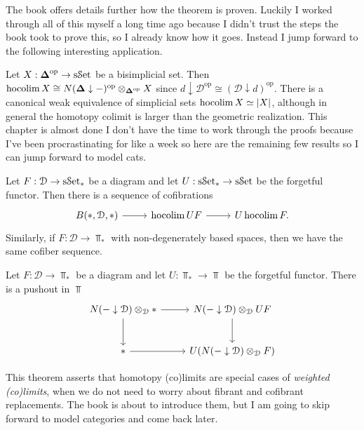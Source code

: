 The book offers details further how the theorem is proven. Luckily I worked through all of this myself a long time ago because I didn't trust the steps the book took to prove this, so I already know how it goes. Instead I jump forward to the following interesting application.

Let $X : \boldsymbol{\Delta} ^{\mathrm{op}}  \to \mathrm{s}\mathcal{S}\mathrm{et}$ be a bisimplicial set. Then $\operatorname*{hocolim} X \cong N(\boldsymbol{\Delta} \downarrow -)^{\mathrm{op}} \otimes_{\boldsymbol{\Delta} ^{\mathrm{op}} } X$ since $d\downarrow \mathcal{D} ^{\mathrm{op}} \cong (\mathcal{D} \downarrow d)^{\mathrm{op}} $. There is a canonical weak equivalence of simplicial sets $\operatorname*{hocolim} X \simeq \left| X \right| $, although in general the homotopy colimit is larger than the geometric realization. This chapter is almost done I don't have the time to work through the proofs because I've been procrastinating for like a week so here are the remaining few results so I can jump forward to model cats.

\begin{theorem}\label{thm:6.5}
	Let $F : \mathcal{D}  \to \mathrm{s}\mathcal{S}\mathrm{et}_*$ be a diagram and let $U : \mathrm{s}\mathcal{S}\mathrm{et}_* \to \mathrm{s}\mathcal{S}\mathrm{et}$ be the forgetful functor. Then there is a sequence of cofibrations
	\[\begin{tikzcd}[row sep = 2.5em, column sep = 2.5em]
		B(*,\mathcal{D} ,*)\ar[r]  & \hocolim UF\ar[r]  & U\hocolim F.
	\end{tikzcd}\]
	Similarly, if $F : \mathcal{D}  \to \Top _*$ with non-degenerately based spaces, then we have the same cofiber sequence.
\end{theorem}
\begin{theorem}\label{thm:6.6}
	Let $F : \mathcal{D}  \to \Top _*$ be a diagram and let $U : \Top _* \to \Top $ be the forgetful functor. There is a pushout in $\Top $
	\[\begin{tikzcd}[row sep = 2.5em, column sep = 2.5em]
	N(-\downarrow \mathcal{D} )\otimes _\mathcal{D} *\ar[r] \ar[d] & N(-\downarrow \mathcal{D} )\otimes _\mathcal{D} UF\ar[d] \\
	*\ar[r]  & U(N(-\downarrow \mathcal{D} )\otimes _\mathcal{D} F)
	\end{tikzcd}\]
\end{theorem}

This theorem asserts that homotopy (co)limits are special cases of \emph{weighted (co)limits}, when we do not need to worry about fibrant and cofibrant replacements. The book is about to introduce them, but I am going to skip forward to model categories and come back later.
